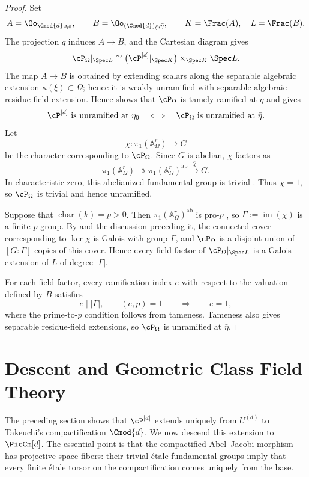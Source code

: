 \begin{proof}
Set
\[
    A=\Oo_{\Cmod{d},\eta_0},\qquad
    B=\Oo_{(\Cmod{d})_{\bar\xi},\bar\eta},\qquad
    K=\Frac(A),\quad L=\Frac(B).
\]
The projection $q$ induces $A\to B$, and the Cartesian diagram gives
\[
    \cP_\Omega|_{\Spec L}
    \cong\bigl(\cP^{[d]}|_{\Spec K}\bigr)
    \times_{\Spec K}\Spec L.
\]
The map $A\to B$ is obtained by extending scalars along the separable
algebraic extension $\kappa(\xi)\subset\Omega$; hence it is weakly
unramified with separable algebraic residue-field extension.
Hence  shows that
$\cP_\Omega$ is tamely ramified at $\bar\eta$ and gives
\[
    \cP^{[d]}\text{ is unramified at }\eta_0
    \quad\Longleftrightarrow\quad
    \cP_\Omega\text{ is unramified at }\bar\eta.
\]
Let
\[
    \chi:\pi_1(\mathbb A^r_\Omega)\longrightarrow G
\]
be the character corresponding to $\cP_\Omega$.
Since $G$ is abelian, $\chi$ factors as
\[
    \pi_1(\mathbb A^r_\Omega)
    \twoheadrightarrow\pi_1(\mathbb A^r_\Omega)^{\mathrm{ab}}
    \xrightarrow{\,\bar\chi\,}G.
\]
In characteristic zero, this abelianized fundamental group is trivial
\cite[Example~4.14]{tendler2015geometricclassfieldtheory}. Thus $\chi=1$,
so $\cP_\Omega$ is trivial and hence unramified.

Suppose that $\operatorname{char}(k)=p>0$. Then
$\pi_1(\mathbb A^r_\Omega)^{\mathrm{ab}}$ is pro-$p$
\cite[Example~4.15]{tendler2015geometricclassfieldtheory}, so
$\Gamma:=\operatorname{im}(\chi)$ is a finite $p$-group.
By  and the discussion
preceding it, the connected cover corresponding to $\ker\chi$ is Galois
with group $\Gamma$, and $\cP_\Omega$ is a disjoint union of
$[G:\Gamma]$ copies of this cover.
Hence every field factor of $\cP_\Omega|_{\Spec L}$ is a Galois extension
of $L$ of degree $|\Gamma|$.

For each field factor, every ramification index $e$ with respect to the
valuation defined by $B$ satisfies
\[
    e\mid |\Gamma|,\qquad (e,p)=1
    \qquad\Longrightarrow\qquad e=1,
\]
where the prime-to-$p$ condition follows from tameness. Tameness also gives
separable residue-field extensions, so $\cP_\Omega$ is unramified at
$\bar\eta$.
\end{proof}

\section{Descent and Geometric Class Field Theory}\label{section:gcft-descent}

The preceding section shows that $\cP^{[d]}$ extends uniquely from
$U^{(d)}$ to Takeuchi's compactification $\Cmod{d}$. We now descend this
extension to $\PicCm[d]$. The essential point is that the compactified
Abel--Jacobi morphism has projective-space fibers: their trivial \'etale
fundamental groups imply that every finite \'etale torsor on the
compactification comes uniquely from the base.

